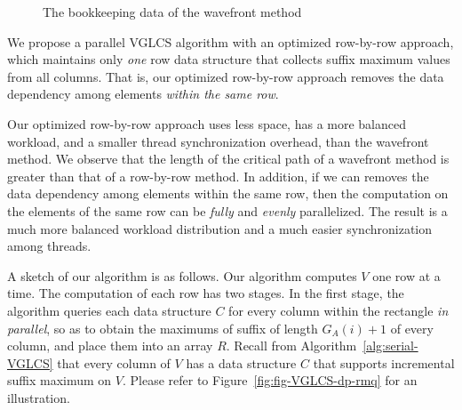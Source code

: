 \begin{figure}[!thb]
  \centering {} 
  \caption{The bookkeeping data of the wavefront method}
  \label{fig:fig-VGLCS-dp-wavefront}
\end{figure}

We propose a parallel VGLCS algorithm with an optimized row-by-row
approach, which maintains only {\em one} row data structure that
collects suffix maximum values from all columns.  That is, our
optimized row-by-row approach removes the data dependency among
elements {\em within the same row}.

Our optimized row-by-row approach uses less space, has a more balanced
workload, and a smaller thread synchronization overhead, than the
wavefront method.  We observe that the length of the critical path of
a wavefront method is greater than that of a row-by-row method.  In
addition, if we can removes the data dependency among elements within
the same row, then the computation on the elements of the same row can
be {\em fully} and {\em evenly} parallelized.  The result is a much
more balanced workload distribution and a much easier synchronization
among threads.





A sketch of our algorithm is as follows.  Our algorithm computes $V$ one
row at a time.  The computation of each row has two stages.  In the
first stage, the algorithm queries each data structure $C$ for every
column within the rectangle {\em in parallel}, so as to obtain the
maximums of suffix of length $G_A(i) + 1$ of every column, and place
them into an array $R$. Recall from Algorithm~\ref{alg:serial-VGLCS}
that every column of $V$ has a data structure $C$ that supports
incremental suffix maximum on $V$.  Please refer to
Figure~\ref{fig:fig-VGLCS-dp-rmq} for an illustration.

